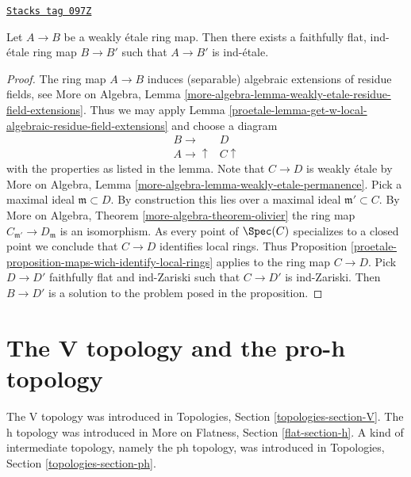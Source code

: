 \begin{proposition}
\label{proetale-proposition-weakly-etale}
\href{https://stacks.math.columbia.edu/tag/097Z}{\texttt{Stacks tag 097Z}}

Let $A \to B$ be a weakly \'etale ring map.
Then there exists a faithfully flat, ind-\'etale ring map
$B \to B'$ such that $A \to B'$ is ind-\'etale.
\end{proposition}

\begin{proof}

The ring map $A \to B$ induces (separable) algebraic extensions of
residue fields, see More on Algebra, Lemma
\ref{more-algebra-lemma-weakly-etale-residue-field-extensions}.
Thus we may apply
Lemma \ref{proetale-lemma-get-w-local-algebraic-residue-field-extensions}
and choose a diagram
$$
\begin{array}{cc}B \longrightarrow & D \\ A \longrightarrow\uparrow & C \uparrow\end{array}
$$
with the properties as listed in the lemma. Note that $C \to D$
is weakly \'etale by
More on Algebra, Lemma \ref{more-algebra-lemma-weakly-etale-permanence}.
Pick a maximal ideal $\mathfrak m \subset D$. By construction
this lies over a maximal ideal $\mathfrak m' \subset C$.
By More on Algebra, Theorem \ref{more-algebra-theorem-olivier}
the ring map $C_{\mathfrak m'} \to D_\mathfrak m$ is an isomorphism.
As every point of $\Spec(C)$ specializes to a closed point we conclude that
$C \to D$ identifies local rings.
Thus Proposition \ref{proetale-proposition-maps-wich-identify-local-rings}
applies to the ring map $C \to D$. Pick $D \to D'$ faithfully flat
and ind-Zariski such that $C \to D'$ is ind-Zariski. Then
$B \to D'$ is a solution to the problem posed in the proposition.
\end{proof}

\section{The V topology and the pro-h topology}
\label{proetale-section-V-versus-pro-h}
The V topology was introduced in
Topologies, Section \ref{topologies-section-V}.
The h topology was introduced in
More on Flatness, Section \ref{flat-section-h}.
A kind of intermediate topology, namely the ph topology,
was introduced in Topologies, Section \ref{topologies-section-ph}.

